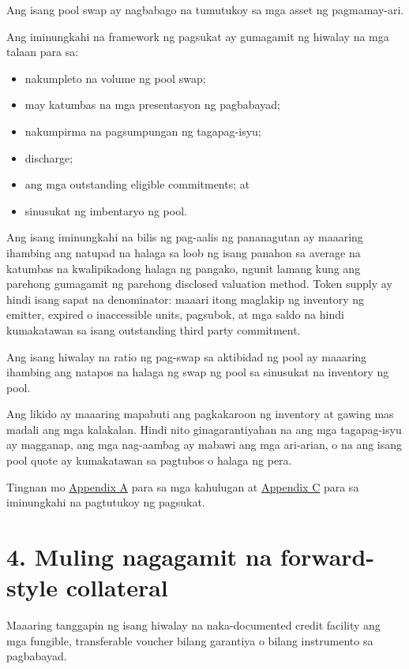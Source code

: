 \documentclass[11pt]{article}
\begin{document}
Ang isang pool swap ay nagbabago na tumutukoy sa mga asset ng pagmamay-ari.

Ang iminungkahi na framework ng pagsukat ay gumagamit ng hiwalay na mga talaan para sa:

\begin{itemize}[leftmargin=*]
\item nakumpleto na volume ng pool swap;
\item may katumbas na mga presentasyon ng pagbabayad;
\item nakumpirma na pagsumpungan ng tagapag-isyu;
\item discharge;
\item ang mga outstanding eligible commitments; at
\item sinusukat ng imbentaryo ng pool.
\end{itemize}
Ang isang iminungkahi na bilis ng pag-aalis ng pananagutan ay maaaring ihambing ang natupad na halaga sa loob ng isang panahon sa average na katumbas na kwalipikadong halaga ng pangako, ngunit lamang kung ang parehong gumagamit ng parehong disclosed valuation method. Token supply ay hindi isang sapat na denominator: maaari itong maglakip ng inventory ng emitter, expired o inaccessible units, pagsubok, at mga saldo na hindi kumakatawan sa isang outstanding third party commitment.

Ang isang hiwalay na ratio ng pag-swap sa aktibidad ng pool ay maaaring ihambing ang natapos na halaga ng swap ng pool sa sinusukat na inventory ng pool.

Ang likido ay maaaring mapabuti ang pagkakaroon ng inventory at gawing mas madali ang mga kalakalan. Hindi nito ginagarantiyahan na ang mga tagapag-isyu ay magganap, ang mga nag-aambag ay mabawi ang mga ari-arian, o na ang isang pool quote ay kumakatawan sa pagtubos o halaga ng pera.

Tingnan mo \href{https://docs.cosmolocal.credit/fil/white-paper/appendix-a-math-box}{Appendix A} para sa mga kahulugan at \href{https://docs.cosmolocal.credit/fil/white-paper/appendix-c-kpi-definitions}{Appendix C} para sa iminungkahi na pagtutukoy ng pagsukat.


\section*{4. Muling nagagamit na forward-style collateral}

Maaaring tanggapin ng isang hiwalay na naka-documented credit facility ang mga fungible, transferable voucher bilang garantiya o bilang instrumento sa pagbabayad.
\end{document}
